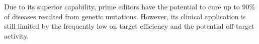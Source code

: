 Due to its superior capability, prime editors have the potential to cure up to 90\% of diseases resulted from genetic mutations. However, its clinical application is still limited by the frequently low on target efficiency and the potential off-target activity\cite{zhaoPrimeEditingAdvances2023}.
